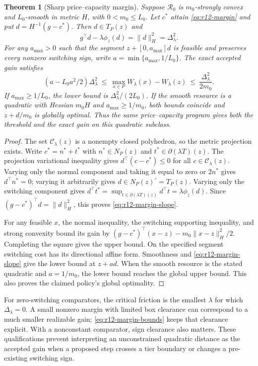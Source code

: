 \documentclass[11pt,letterpaper]{article}
\newtheorem{theorem}{Theorem}[section]
\theoremstyle{definition}
\newcommand{\1}{\mathbf 1}
\begin{document}
\begin{theorem}[Sharp price--capacity margin]\label{thm:r12-margin}
Suppose $\mathcal R_0$ is $m_0$-strongly convex and $L_0$-smooth in metric $H$, with $0<m_0\leq L_0$. Let $c^*$ attain \eqref{eq:r12-margin} and put $d=H^{-1}(g-c^*)$. Then $d\in T_P(z)$ and
\begin{equation}\label{eq:r12-margin-slope}
 g^\top d-\lambda\phi_z(d)=\|d\|_H^2=\Delta_\lambda^2.
\end{equation}
For any $a_{\max}>0$ such that the segment $z+[0,a_{\max}]d$ is feasible and preserves every nonzero switching sign, write $a=\min\{a_{\max},1/L_0\}$. The exact accepted gain satisfies
\begin{equation}\label{eq:r12-margin-bounds}
 (a-L_0a^2/2)\Delta_\lambda^2
 \ \leq\ \max_{x\in P}W_\lambda(x)-W_\lambda(z)
 \ \leq\ \frac{\Delta_\lambda^2}{2m_0}.
\end{equation}
If $a_{\max}\geq1/L_0$, the lower bound is $\Delta_\lambda^2/(2L_0)$. If the smooth resource is a quadratic with Hessian $m_0H$ and $a_{\max}\geq1/m_0$, both bounds coincide and $z+d/m_0$ is globally optimal. Thus the same price--capacity program gives both the threshold and the exact gain on this quadratic subclass.
\end{theorem}
\begin{proof}
The set $\mathcal C_\lambda(z)$ is a nonempty closed polyhedron, so the metric projection exists. Write $c^*=n^*+t^*$ with $n^*\in N_P(z)$ and $t^*\in\partial(\lambda T)(z)$. The projection variational inequality gives $d^\top(c-c^*)\leq0$ for all $c\in\mathcal C_\lambda(z)$. Varying only the normal component and taking it equal to zero or $2n^*$ gives $d^\top n^*=0$; varying it arbitrarily gives $d\in N_P(z)^\circ=T_P(z)$. Varying only the switching component gives
$d^\top t^*=\sup_{t\in\partial(\lambda T)(z)}d^\top t=\lambda\phi_z(d)$.
Since $(g-c^*)^\top d=\|d\|_H^2$, this proves \eqref{eq:r12-margin-slope}.

For any feasible $x$, the normal inequality, the switching supporting inequality, and strong convexity bound its gain by
$(g-c^*)^\top(x-z)-m_0\|x-z\|_H^2/2$. Completing the square gives the upper bound. On the specified segment switching cost has its directional affine form. Smoothness and \eqref{eq:r12-margin-slope} give the lower bound at $z+ad$. When the smooth resource is the stated quadratic and $a=1/m_0$, the lower bound reaches the global upper bound. This also proves the claimed policy's global optimality.
\end{proof}
For zero-switching comparators, the critical friction is the smallest $\lambda$ for which $\Delta_\lambda=0$. A small nonzero margin with limited box clearance can correspond to a much smaller realizable gain; \eqref{eq:r12-margin-bounds} keeps that clearance explicit. With a nonconstant comparator, sign clearance also matters. These qualifications prevent interpreting an unconstrained quadratic distance as the accepted gain when a proposed step crosses a tier boundary or changes a pre-existing switching sign.
\end{document}

